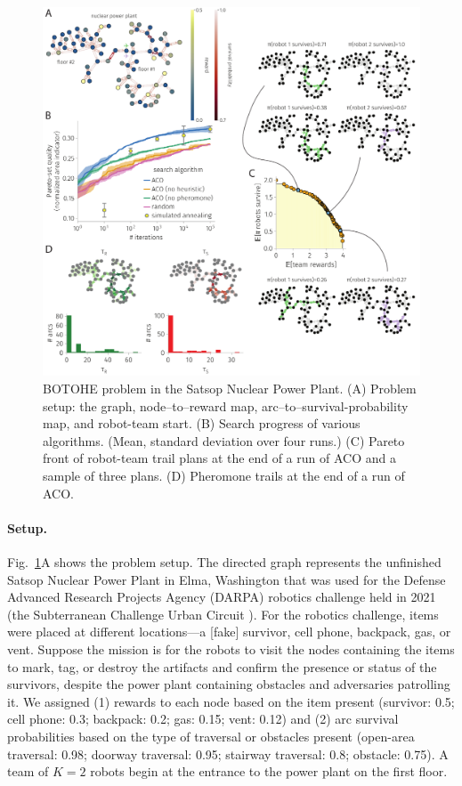 \documentclass[fleqn,10pt,lineno]{wlpeerj}
\begin{document}
\begin{figure}[h!]
    \centering
    	\includegraphics[width=\textwidth]{power_plant_results.pdf}
    \caption{
    BOTOHE problem in the Satsop Nuclear Power Plant. 
    (A) Problem setup: the graph, node--to--reward map, arc--to--survival-probability map, and robot-team start.
    (B) Search progress of various algorithms. (Mean, standard deviation over four runs.)
    (C) Pareto front of robot-team trail plans at the end of a run of ACO and a sample of three plans.
    (D) Pheromone trails at the end of a run of ACO.
    } \label{fig:power_plant}
\end{figure}

\paragraph{Setup.} 
Fig.~\ref{fig:power_plant}A shows the problem setup.
The directed graph represents the unfinished Satsop Nuclear Power Plant in Elma, Washington that was used for the Defense Advanced Research Projects Agency (DARPA) robotics challenge held in 2021 \cite{ackerman2022robots,orekhov2022darpa} (the Subterranean Challenge Urban Circuit \cite{githubdarpasubt}). For the robotics challenge, items were placed at different locations---a [fake] survivor, cell phone, backpack, gas, or vent.
Suppose the mission is for the robots to visit the nodes containing the items to mark, tag, or destroy the artifacts and confirm the presence or status of the survivors, despite the power plant containing obstacles and adversaries patrolling it. 
We assigned 
(1) rewards to each node based on the item present 
(survivor: 0.5; cell phone: 0.3; backpack: 0.2; gas: 0.15; vent: 0.12)
and
(2) arc survival probabilities based on the type of traversal or obstacles present
(open-area traversal: 0.98; doorway traversal: 0.95; stairway traversal: 0.8; obstacle: 0.75). A team of $K=2$ robots begin at the entrance to the power plant on the first floor.
\end{document}
